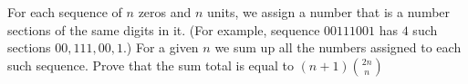 For each sequence of $n$ zeros and $n$ units, we assign a number that is a number sections of the same digits in it. (For example, sequence $00111001$ has $4$ such sections $00, 111,00, 1$.) For a given $n$ we sum up all the numbers assigned to each such sequence. Prove that the sum total is equal to $(n+1){2n \choose n} $